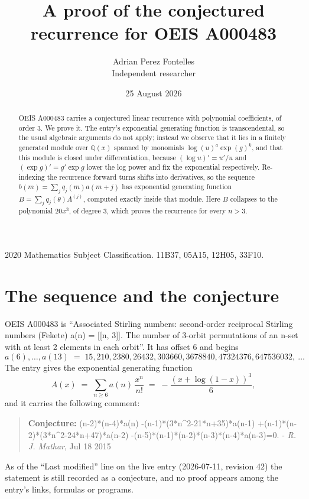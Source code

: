 \documentclass[11pt,a4paper]{article}
\title{A proof of the conjectured recurrence for OEIS A000483}
\author{Adrian Perez Fontelles\\ \small Independent researcher}
\date{25 August 2026}
\theoremstyle{plain}
\theoremstyle{definition}
\begin{document}
\maketitle

\begin{abstract}
OEIS A000483 carries a conjectured linear recurrence with polynomial coefficients, of
order 3. We prove it. The entry's exponential generating function is
transcendental, so the usual algebraic arguments do not apply; instead we observe that it
lies in a finitely generated module over $\mathbb{Q}(x)$ spanned by monomials
$\log(u)^{a}\exp(g)^{k}$, and that this module is closed under differentiation, because
$(\log u)'=u'/u$ and $(\exp g)'=g'\exp g$ lower the log power and fix the exponential
respectively. Re-indexing the recurrence forward turns shifts into derivatives, so the
sequence $b(m)=\sum_{j}q_{j}(m)a(m+j)$ has exponential generating function
$B=\sum_{j}q_{j}(\theta)A^{(j)}$, computed exactly inside that module. Here $B$ collapses
to the polynomial $20 x^{3}$, of degree $3$, which proves the recurrence for every
$n>3$.
\end{abstract}

\noindent\small 2020 Mathematics Subject Classification. 11B37, 05A15, 12H05, 33F10.\normalsize

\section{The sequence and the conjecture}

OEIS A000483 is ``Associated Stirling numbers: second-order reciprocal Stirling numbers (Fekete) a(n) = [[n, 3]]. The number of 3-orbit permutations of an n-set with at least 2 elements in each orbit''. It has offset $6$ and begins
\[
a(6),\dots,a(13)\;=\;15, 210, 2380, 26432, 303660, 3678840, 47324376, 647536032,\ \dots
\]
The entry gives the exponential generating function
\begin{equation}\label{eq:gf}
A(x)\;=\;\sum_{n\ge 6} a(n)\,\frac{x^{n}}{n!}\;=\;- \frac{\left(x + \log{\left(1 - x \right)}\right)^{3}}{6} ,
\end{equation}
and it carries the following comment:
\begin{quote}\small
\textbf{Conjecture:} (n-2)*(n-4)*a(n) -(n-1)*(3*n\^{}2-21*n+35)*a(n-1) +(n-1)*(n-2)*(3*n\^{}2-24*n+47)*a(n-2) -(n-5)*(n-1)*(n-2)*(n-3)*(n-4)*a(n-3)=0. - \emph{R. J. Mathar}, Jul 18 2015
\end{quote}
As of the ``Last modified'' line on the live entry (2026-07-11, revision 42) the
statement is still recorded as a conjecture, and no proof appears among the entry's links,
formulas or programs.
\end{document}
